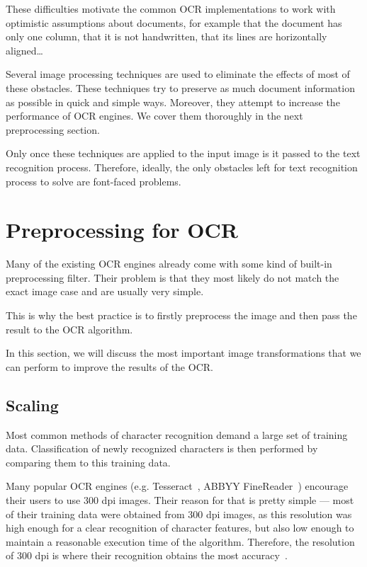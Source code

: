These difficulties motivate the common OCR implementations to work with optimistic assumptions about documents, for example that the document has only one column, that it is not handwritten, that its lines are horizontally aligned\ldots

Several image processing techniques are used to eliminate the effects of most of
these obstacles. These techniques try to preserve as much document information as possible in quick and simple ways. Moreover, they attempt to increase the performance of OCR engines. We cover them thoroughly in the next preprocessing section.

Only once these techniques are applied to the input image is it passed to the text recognition process. Therefore, ideally, the only obstacles left for text recognition process to solve are font-faced problems.

\section{Preprocessing for OCR}

Many of the existing OCR engines already come with some kind of built-in preprocessing filter. Their problem is that they most likely do not match the exact image case and are usually very simple.

This is why the best practice is to firstly preprocess the image and then pass the result to the OCR algorithm.

In this section, we will discuss the most important image transformations that we can perform to improve the results of the OCR. 

\subsection{Scaling}

Most common methods of character recognition demand a large set of training data. Classification of newly recognized characters is then performed by comparing them to this training data.

Many popular OCR engines (e.g. Tesseract~\cite{TesseractQual}, ABBYY FineReader~\cite{ABBYYdpi}) encourage their users to use 300 dpi images. Their reason for that is pretty simple --- most of their training data were obtained from 300 dpi images, as this resolution was high enough for a clear recognition of character features, but also low enough to maintain a reasonable execution time of the algorithm. Therefore, the resolution of 300 dpi is where their recognition obtains the most accuracy~\cite{preprocessAll}. 

